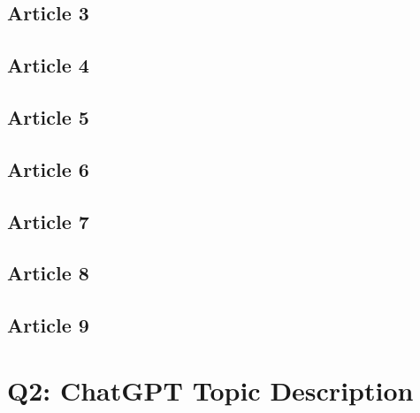 \documentclass[12pt]{article}
\begin{document}
\subsection{Article 3}

\subsection{Article 4}

\subsection{Article 5}

\subsection{Article 6}

\subsection{Article 7}

\subsection{Article 8}

\subsection{Article 9}


\section{Q2: ChatGPT Topic Description}


\end{document}
